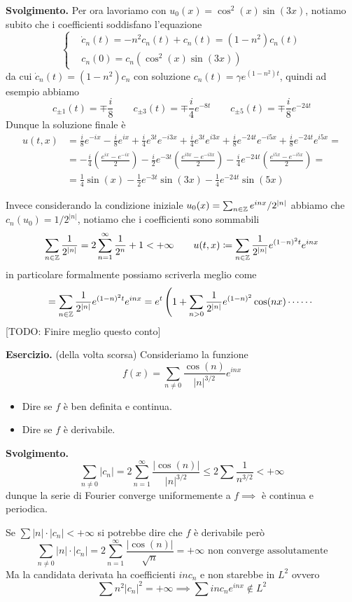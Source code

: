\textbf{Svolgimento.}
Per ora lavoriamo con $u_0(x) = \cos^2(x) \sin(3x)$, notiamo subito che i coefficienti soddisfano l'equazione
$$
\left\{
\begin{aligned}
	& \dot c_n(t) = -n^2 c_n(t) + c_n(t) = (1 - n^2) c_n(t) \\
	& c_n(0) = c_n(\cos^2(x) \sin(3x))
\end{aligned}
\right.
$$
da cui $\dot c_n(t) = (1 - n^2)c_n$ con soluzione $c_n(t) = \gamma e^{(1 - n^2) t}$, quindi ad esempio abbiamo
$$
c_{\pm 1}(t) = \mp \frac{i}{8}
\qquad
c_{\pm 3}(t) = \mp \frac{i}{4} e^{-8t}
\qquad
c_{\pm 5}(t) = \mp \frac{i}{8} e^{-24t}
$$
Dunque la soluzione finale è
$$
\begin{aligned}
	u(t, x) 
	&= \frac{i}{8} e^{-ix} -\frac{i}{8} e^{ix} + \frac{i}{4}e^{3t} e^{-i3x} + \frac{i}{4}e^{3t} e^{i3x} + \frac{i}{8} e^{-24t} e^{-i5x} + \frac{i}{8} e^{-24 t} e^{i5x} = \\
	&= 
	-\frac{i}{4} \left( \frac{e^{ix} - e^{-ix}}{2} \right)
	-\frac{i}{2} e^{-3t} \left( \frac{e^{i3x} - e^{-i3x}}{2} \right)
	-\frac{i}{4} e^{-24t} \left( \frac{e^{i5x} - e^{-i5x}}{2} \right) = \\
	&= 
	\frac{1}{4} \sin(x) 
	- \frac{1}{2} e^{-3t} \sin(3x)
	- \frac{1}{4} e^{-24t} \sin(5x)
\end{aligned}
$$

Invece considerando la condizione iniziale $u_0(x) = \sum_{n \in \mathbb Z} e^{inx} / 2^{|n|}$ abbiamo che $c_n(u_0) = 1 / 2^{|n|}$, notiamo che i coefficienti sono sommabili
$$
\sum_{n \in \mathbb Z} \frac{1}{2^{|n|}} 
= 2 \sum_{n=1}^\infty \frac{1}{2^n} + 1 < +\infty
\qquad
u(t, x) \coloneqq \sum_{n \in \mathbb Z} \frac{1}{2^{|n|}} e^{(1 - n)^2 t} e^{inx}
$$
in particolare formalmente possiamo scriverla meglio come
$$
= \sum_{n \in \mathbb Z} \frac{1}{2^{|n|}} e^{(1 - n)^2 t} e^{inx}
= e^t \left(1 + \sum_{n > 0} \frac{1}{2^{|n|}} e^{(1 - n)^2} \cos(nx) \cdots\cdots \right.
$$
[TODO: Finire meglio questo conto]

\textbf{Esercizio.} (della volta scorsa)
Consideriamo la funzione
$$
f(x) = \sum_{n \neq 0} \frac{\cos(n)}{|n|^{3/2}} e^{inx}
$$
\begin{itemize}
	\item Dire se $f$ è ben definita e continua.
	\item Dire se $f$ è derivabile.
\end{itemize}

\textbf{Svolgimento.}
$$
\sum_{n \neq 0} |c_n| 
= 2 \sum_{n=1}^\infty \frac{|\cos(n)|}{|n|^{3/2}}
\leq 2 \sum \frac{1}{n^{3/2}} < +\infty
$$
dunque la serie di Fourier converge uniformemente a $f \implies$ è continua e periodica.

Se $\sum |n| \cdot |c_n| < +\infty$ si potrebbe dire che $f$ è derivabile però
$$
\sum_{n \neq 0} |n| \cdot |c_n| = 2 \sum_{n=1}^\infty \frac{|\cos(n)|}{\sqrt{n}} = +\infty
\text{ non converge assolutamente}
$$
Ma la candidata derivata ha coefficienti $i n c_n$ e non starebbe in $L^2$ ovvero
$$
\sum n^2 |c_n|^2 = +\infty \implies \sum i n c_n e^{inx} \notin L^2
$$
